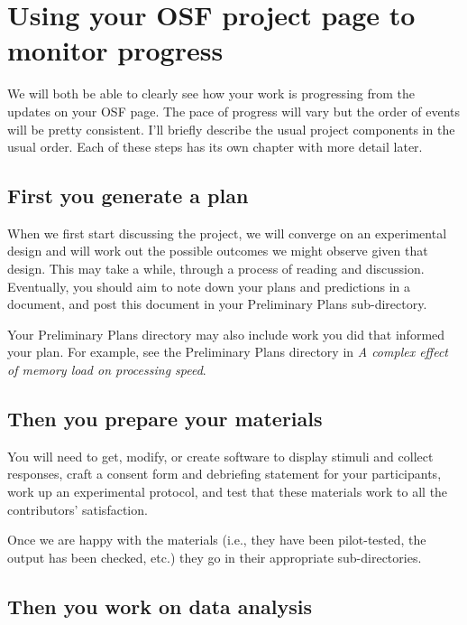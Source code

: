 \documentclass[
  12pt,
]{book}
\begin{document}
\section{Using your OSF project page to monitor progress}\label{using-your-osf-project-page-to-monitor-progress}

We will both be able to clearly see how your work is progressing from the updates on your OSF page. The pace of progress will vary but the order of events will be pretty consistent. I'll briefly describe the usual project components in the usual order. Each of these steps has its own chapter with more detail later.

\subsection{First you generate a plan}\label{first-you-generate-a-plan}

When we first start discussing the project, we will converge on an experimental design and will work out the possible outcomes we might observe given that design. This may take a while, through a process of reading and discussion. Eventually, you should aim to note down your plans and predictions in a document, and post this document in your Preliminary Plans sub-directory.

Your Preliminary Plans directory may also include work you did that informed your plan. For example, see the Preliminary Plans directory in \emph{A complex effect of memory load on processing speed}.

\subsection{Then you prepare your materials}\label{then-you-prepare-your-materials}

You will need to get, modify, or create software to display stimuli and collect responses, craft a consent form and debriefing statement for your participants, work up an experimental protocol, and test that these materials work to all the contributors' satisfaction.

Once we are happy with the materials (i.e., they have been pilot-tested, the output has been checked, etc.) they go in their appropriate sub-directories.

\subsection{Then you work on data analysis}\label{then-you-work-on-data-analysis}
\end{document}
